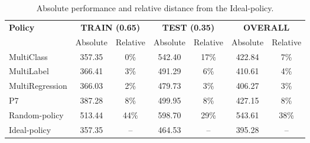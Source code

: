 \documentclass[authoryear,preprint,12pt]{elsarticle}
\newcommand{\rev}[1]{\textcolor{blue}{{#1}}}
\begin{document}
\begin{table}[ht]
\centering
\begin{tabular}{l*{6}{c}}
\multirow{2}{*}{\textbf{Policy}} & \multicolumn{2}{c}{\textbf{TRAIN (0.65)}} & \multicolumn{2}{c}{\textbf{TEST (0.35)}} & \multicolumn{2}{c}{\textbf{OVERALL}} \\
\cmidrule(lr){2-3} \cmidrule(lr){4-5} \cmidrule(lr){6-7}
 & Absolute & Relative & Absolute & Relative & Absolute & Relative \\

MultiClass & 357.35 & 0\%    & 542.40 & 17\%  & 422.84 & 7\% \\
MultiLabel  & 366.41 & 3\%   & 491.29 & 6\%   & 410.61 & 4\% \\
MultiRegression & 366.03 & 2\%   & 479.73 & 3\%   & 406.27 & 3\% \\ 
\cmidrule(lr){2-3} \cmidrule(lr){4-5} \cmidrule(lr){6-7}
P7       & 387.28 & 8\%    & 499.95 & 8\%   & 427.15 & 8\% \\
Random-policy & 513.44 & 44\%  & 598.70 & 29\%   & 543.61 & 38\% \\
Ideal-policy & 357.35 & --  & 464.53 & --    & 395.28 & -- \\
\end{tabular}
\caption{Absolute performance and relative distance from the Ideal-policy.} 
\label{tab:ml_results}
\end{table}
\end{document}
